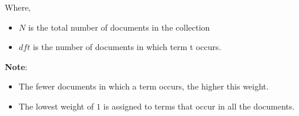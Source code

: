 Where,
\begin{itemize}
    \item $N$ is the total number of documents in the collection
    \item $dft$ is the number of documents in which term t occurs.
\end{itemize}

\vspace{0.2cm}
\textbf{Note}:
\begin{itemize}
    \item The fewer documents in which a term occurs, the higher this weight.

    \item The lowest weight of $1$ is assigned to terms that occur in all the documents.

    
\end{itemize}


